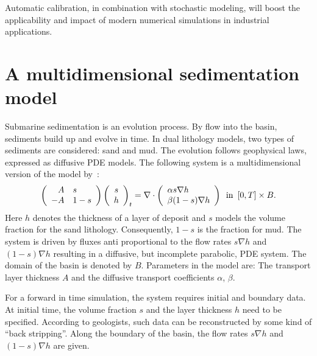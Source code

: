Automatic calibration, in combination with stochastic modeling, will
boost the applicability and impact of modern numerical simulations in
industrial applications.

\section{A multidimensional sedimentation model}

Submarine sedimentation is an evolution process.  By flow into the
basin, sediments build up and evolve in time.  In dual lithology
models, two types of sediments are considered: sand and mud.  The
evolution follows geophysical laws, expressed as diffusive PDE models.
The following system is a multidimensional version of the model
by~\citet{Rivenaes1992, Rivenaes1993}:
\begin{equation} \label{eq:schroll:model}
\left(\begin{array}{rl} A & s \\ -A & 1-s \end{array}\right)
\left(\begin{array}{c} s \\ h \end{array}\right)_t =
\nabla \cdot \left( \begin{array}{l} \alpha s \nabla h \\ \beta (1-s) \nabla h \end{array} \right)
\enspace \hbox{in} \enspace [0,T] \times B.
\end{equation}
Here $h$ denotes the thickness of a layer of deposit and $s$ models
the volume fraction for the sand lithology.  Consequently, $1-s$ is
the fraction for mud.  The system is driven by fluxes anti
proportional to the flow rates $s \nabla h$ and $(1-s) \nabla h$
resulting in a diffusive, but incomplete parabolic, PDE system.  The
domain of the basin is denoted by $B$.  Parameters in the model are:
The transport layer thickness $A$ and the diffusive transport
coefficients $\alpha$, $\beta$.

For a forward in time simulation, the system requires initial and
boundary data.  At initial time, the volume fraction $s$ and the layer
thickness $h$ need to be specified. According to geologists, such
data can be reconstructed by some kind of ``back stripping''.  Along
the boundary of the basin, the flow rates $s \nabla h$ and
$(1-s) \nabla h$ are given.

